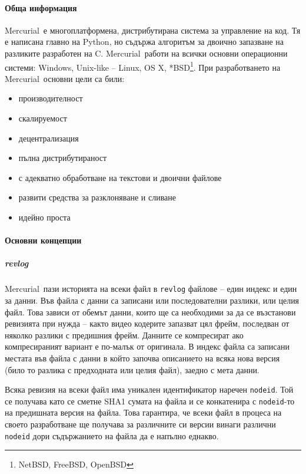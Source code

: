 \documentclass[a4paper]{article}
\def\Hg{Mercurial}
\begin{document}
    \paragraph{Обща информация}
    \Hg\ е многоплатформена, дистрибутирана система за управление на код. Тя
    е написана главно на Python, но съдържа алгоритъм за двоично
    запазване на разликите разработен на C. \Hg\ работи на всички основни
    операционни системи: Windows, Unix-like -- Linux, OS X, *BSD\footnote{NetBSD, FreeBSD, OpenBSD}. При
    разработването на \Hg\ основни цели са били:
    \begin{itemize}
      \item производителност
      \item скалируемост
      \item децентрализация
      \item пълна дистрибутираност
      \item с адекватно обработване на текстови и двоични файлове
      \item развити средства за разклоняване и сливане
      \item идейно проста
    \end{itemize}

    \paragraph{Основни концепции}
    \subparagraph{revlog}
    \Hg\ пази историята на всеки файл в \texttt{revlog} файлове -- един индекс 
    и един за данни. Във файла с данни са записани или последователни разлики, или
    целия файл. Това зависи от обемът данни, които ще са необходими за да се
    възстанови ревизията при нужда -- както видео кодерите запазват цял фрейм,
    последван от няколко разлики с предишния фрейм. Данните се компресират ако
    компресираният вариант е по-малък от оригинала. В индекс файла са записани
    местата във файла с данни в който започва описанието на всяка нова версия
    (било то разлика с предходната или целия файл), заедно с мета данни.

    Всяка ревизия на всеки файл има уникален идентификатор наречен
    \texttt{nodeid}. Той се получава като се сметне SHA1\cite{sha1} сумата на
    файла и се конкатенира с \texttt{nodeid}-то на предишната версия на файла.
    Това гарантира, че всеки файл в процеса на своето разработване ще получава
    за различните си версии винаги различни \texttt{nodeid} дори съдържанието
    на файла да е напълно еднакво.
    \vspace{5 mm}
\end{document}
